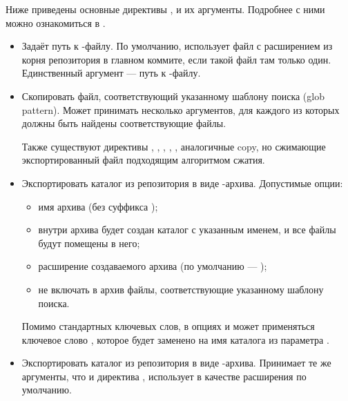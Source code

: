 Ниже приведены основные директивы , и их аргументы. Подробнее с ними можно ознакомиться в .

\begin{itemize}
	\item \textbf{}
	
	Задаёт путь к -файлу. По умолчанию,  использует файл с расширением  из корня репозитория в главном коммите, если такой файл там только один. Единственный аргумент --- путь к -файлу.
	
	\item \textbf{}
	
	Скопировать файл, соответствующий указанному шаблону поиска (glob pattern). Может принимать несколько аргументов, для каждого из которых должны быть найдены соответствующие файлы.
	
	Также существуют директивы , , , , , аналогичные copy, но сжимающие экспортированный файл подходящим алгоритмом сжатия.
	
	\item  \textbf{}
	
	Экспортировать каталог из репозитория в виде -архива. Допустимые опции: 
	\begin{itemize}
		\item {} имя архива (без суффикса );
		
		\item {} внутри архива будет создан каталог с указанным именем, и все файлы будут помещены в него;
		
		\item {} расширение создаваемого архива (по умолчанию --- );
		
		\item {} не включать в архив файлы, соответствующие указанному шаблону поиска.
	\end{itemize}
	
	Помимо стандартных ключевых слов, в опциях  и  может применяться ключевое слово , которое будет заменено на имя каталога из параметра . 
	
	\item \textbf{}
	
	Экспортировать каталог из репозитория в виде -архива. Принимает те же аргументы, что и директива , использует  в качестве расширения по умолчанию. 
	

\end{itemize}
